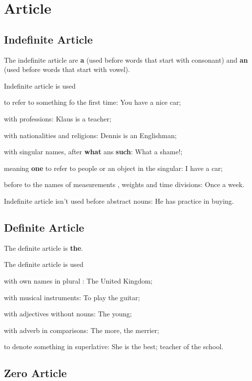 \documentclass[a4paper, titlepage]{article}
\begin{document}
\section{Article}
\subsection{Indefinite Article}
The indefinite article are \textbf{a} (used before words that start with consonant) and \textbf{an} (used before words that start with vowel).


Indefinite article is used
\begin{list}{}{}
\item to refer to something fo the first time: You have a nice car;
\item with professions: Klaus is a teacher;
\item with nationalities and  religions: Dennis is an Englishman;
\item with singular names, after \textbf{what} ans \textbf{such}: What a shame!;
\item meaning \textbf{one} to refer to people  or an object in the singular: I have a car;
\item before to the names  of measurements , weights and time divisions: Once a week.
\end{list}
Indefinite article isn't used before abstract nouns: He has practice in buying.
\subsection{Definite Article}
The definite article is \textbf{the}.


The definite article is used
\begin{list}
\item with own names in plural : The United Kingdom;
\item with musical instruments: To play the guitar;
\item with adjectives without nouns: The young;
\item with adverb in comparisons: The more, the merrier;
\item to denote something in superlative: She is the best; teacher of the school.
\end{list}

\subsection{Zero Article}
\end{document}
